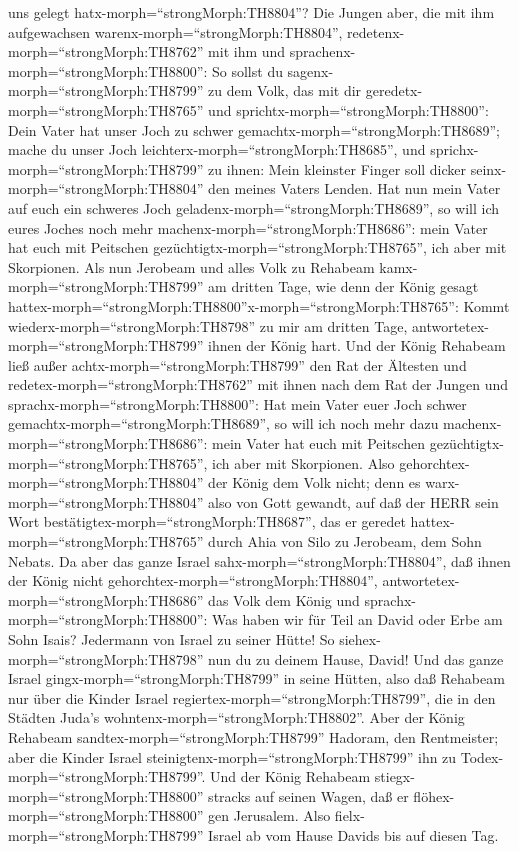 uns gelegt hatx-morph=``strongMorph:TH8804''?  Die Jungen
aber, die mit ihm aufgewachsen warenx-morph=``strongMorph:TH8804'',
redetenx-morph=``strongMorph:TH8762'' mit ihm und
sprachenx-morph=``strongMorph:TH8800'': So sollst du
sagenx-morph=``strongMorph:TH8799'' zu dem Volk, das mit dir
geredetx-morph=``strongMorph:TH8765'' und
sprichtx-morph=``strongMorph:TH8800'': Dein Vater hat unser Joch zu
schwer gemachtx-morph=``strongMorph:TH8689''; mache du unser Joch
leichterx-morph=``strongMorph:TH8685'', und
sprichx-morph=``strongMorph:TH8799'' zu ihnen: Mein kleinster Finger
soll dicker seinx-morph=``strongMorph:TH8804'' den meines Vaters Lenden.
 Hat nun mein Vater auf euch ein schweres Joch
geladenx-morph=``strongMorph:TH8689'', so will ich eures Joches noch
mehr machenx-morph=``strongMorph:TH8686'': mein Vater hat euch mit
Peitschen gezüchtigtx-morph=``strongMorph:TH8765'', ich aber mit
Skorpionen.  Als nun Jerobeam und alles Volk zu Rehabeam
kamx-morph=``strongMorph:TH8799'' am dritten Tage, wie denn der König
gesagt
hattex-morph=``strongMorph:TH8800''x-morph=``strongMorph:TH8765'': Kommt
wiederx-morph=``strongMorph:TH8798'' zu mir am dritten Tage,
 antwortetex-morph=``strongMorph:TH8799'' ihnen der König
hart. Und der König Rehabeam ließ außer
achtx-morph=``strongMorph:TH8799'' den Rat der Ältesten 
und redetex-morph=``strongMorph:TH8762'' mit ihnen nach dem Rat der
Jungen und sprachx-morph=``strongMorph:TH8800'': Hat mein Vater euer
Joch schwer gemachtx-morph=``strongMorph:TH8689'', so will ich noch mehr
dazu machenx-morph=``strongMorph:TH8686'': mein Vater hat euch mit
Peitschen gezüchtigtx-morph=``strongMorph:TH8765'', ich aber mit
Skorpionen.  Also gehorchtex-morph=``strongMorph:TH8804''
der König dem Volk nicht; denn es warx-morph=``strongMorph:TH8804'' also
von Gott gewandt, auf daß der HERR sein Wort
bestätigtex-morph=``strongMorph:TH8687'', das er geredet
hattex-morph=``strongMorph:TH8765'' durch Ahia von Silo zu Jerobeam, dem
Sohn Nebats.  Da aber das ganze Israel
sahx-morph=``strongMorph:TH8804'', daß ihnen der König nicht
gehorchtex-morph=``strongMorph:TH8804'',
antwortetex-morph=``strongMorph:TH8686'' das Volk dem König und
sprachx-morph=``strongMorph:TH8800'': Was haben wir für Teil an David
oder Erbe am Sohn Isais? Jedermann von Israel zu seiner Hütte! So
siehex-morph=``strongMorph:TH8798'' nun du zu deinem Hause, David! Und
das ganze Israel gingx-morph=``strongMorph:TH8799'' in seine Hütten,
 also daß Rehabeam nur über die Kinder Israel
regiertex-morph=``strongMorph:TH8799'', die in den Städten Juda's
wohntenx-morph=``strongMorph:TH8802''.  Aber der König
Rehabeam sandtex-morph=``strongMorph:TH8799'' Hadoram, den Rentmeister;
aber die Kinder Israel steinigtenx-morph=``strongMorph:TH8799'' ihn zu
Todex-morph=``strongMorph:TH8799''. Und der König Rehabeam
stiegx-morph=``strongMorph:TH8800'' stracks auf seinen Wagen, daß er
flöhex-morph=``strongMorph:TH8800'' gen Jerusalem.  Also
fielx-morph=``strongMorph:TH8799'' Israel ab vom Hause Davids bis auf
diesen Tag.


